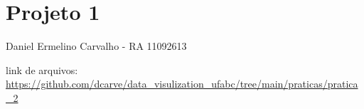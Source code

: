 





\frenchspacing 


\textual

	

	\chapter{Projeto 1}
		Daniel Ermelino Carvalho - RA 11092613

		link de arquivos:
		\url{https://github.com/dcarve/data_visulization_ufabc/tree/main/praticas/pratica_2}
	
	

	

	



\printindex




